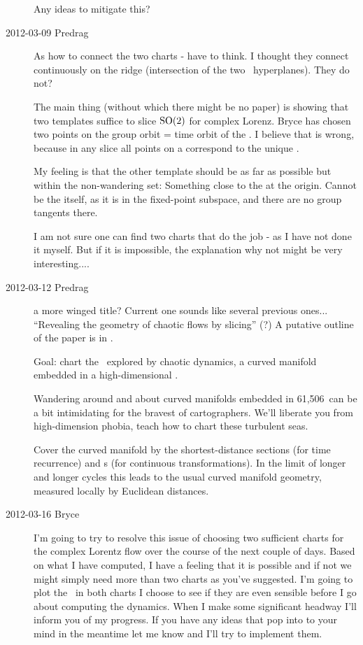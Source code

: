 \begin{description}
Any ideas to mitigate this?

\item[2012-03-09 Predrag]
As how to connect the two charts - have to think. I thought they connect
continuously on the ridge (intersection of the two \slice\ hyperplanes).
They do not?

The main thing (without which there might be no paper) is showing that
two templates suffice to slice $\textrm{SO}(2)$ for complex Lorenz. Bryce has chosen
two points on the group orbit = time orbit of the {\reqv}. I
believe that is wrong, because in any slice all points on a
{\reqv} correspond to the unique {\eqv}.

My feeling is that the other template should be as far as possible but
within the non-wandering set: Something close to the {\eqv} at the
origin. Cannot be the {\eqv} itself, as it is in the fixed-point
subspace, and there are no group tangents there.

I am not sure one can find two charts that do the job - as I have not
done it myself. But if it is impossible, the explanation why not might be
very interesting....

\item[2012-03-12  Predrag]
a more winged title? Current one sounds like several previous ones...
``Revealing the geometry of chaotic flows by slicing'' (?)
A putative outline of the paper is in
.

Goal: chart the \statesp\ explored by chaotic dynamics,
a curved manifold embedded in a high-dimensional \statesp.

Wandering around and about curved manifolds embedded in 61,506\dmn\ can
be a bit intimidating for the bravest of cartographers. We'll liberate
you from high-dimension phobia, teach how to chart these turbulent seas.

Cover the curved manifold by the shortest-distance sections (for time
recurrence) and \slice s (for continuous transformations). In the limit of longer
and longer cycles this leads to the usual curved manifold geometry,
measured locally by Euclidean distances.


\item[2012-03-16 Bryce]
I'm going to try to resolve this issue of choosing two sufficient charts
for the complex Lorentz flow over the course of the next couple of days.
Based on what I have computed, I have a feeling that it is possible and
if not we might simply need more than two charts as you've suggested. I'm
going to plot the \chartBord\ in both charts I choose to see
if they are even sensible before I go about computing the dynamics. When
I make some significant headway I'll inform you of my progress. If you
have any ideas that pop into to your mind in the meantime let me know and
I'll try to implement them.


\end{description}

